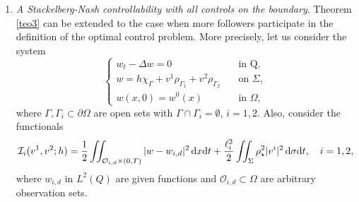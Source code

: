 \documentclass{aims}
\theoremstyle{definition}
\def\cbd{\Gamma}
\def\dx{\,\textnormal{d}x}
\def\dt{\textnormal{d}t}
\def\d{\,\textnormal{d}}
\begin{document}
\begin{enumerate}
\item \textit{A Stackelberg-Nash controllability with all controls on the boundary}. Theorem \ref{teo3} can be extended to the case when more followers participate in the definition of the optimal control problem. More precisely, let us consider the system
%
\begin{equation}\label{sys_sec3}
\begin{cases}
w_t-\Delta w=0 & \quad \text{in Q}, \\
w=h\chi_{\cbd}+ v^1\rho_{\Gamma_1}+v^2\rho_{\Gamma_2}&\quad \text{on } \Sigma, \\
w(x,0)=w^0(x) &\quad \text{in } \Omega,
\end{cases}
\end{equation}
% 
where $\Gamma,\Gamma_i\subset \partial \Omega$ are open sets with $\Gamma\cap\Gamma_i=\emptyset$, $i=1,2$. Also, consider the functionals
%
\begin{equation}\label{func_nash}
\mathcal I_i(v^1,v^2;h)=\frac{1}{2}\iint_{\mathcal O_{i,d}\times(0,T)}|w-w_{i,d}|^2\dx\dt+\frac{\ell_i^2}{2}\iint_{\Sigma}\rho_\star^2|v^{i}|^2\d\sigma\dt, \quad i=1,2,
\end{equation}
%
where $w_{i,d}$ in $L^2(Q)$ are given functions and $\mathcal{O}_{i,d}\subset \Omega$ are arbitrary observation sets.


\end{enumerate}
\end{document}
